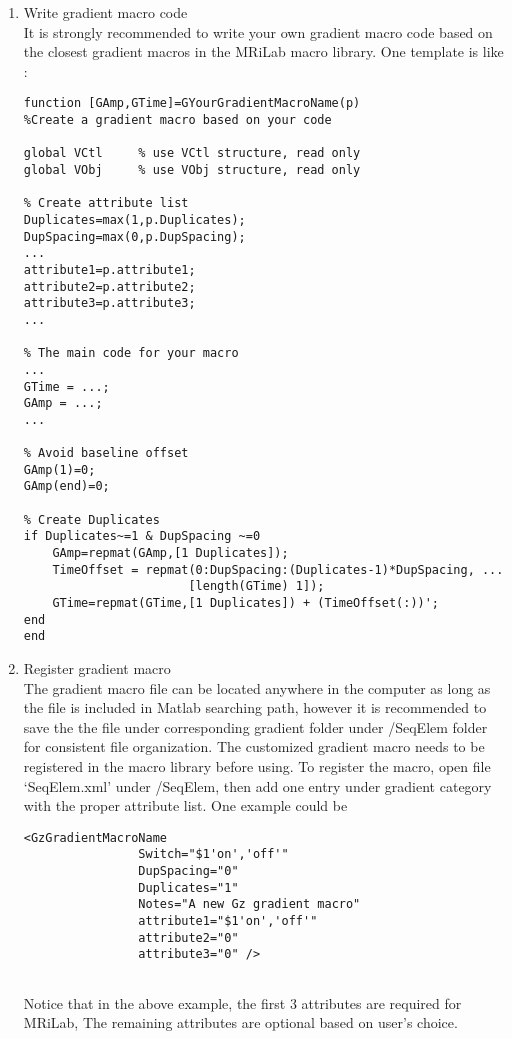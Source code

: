\documentclass{book}%
\begin{document}
\begin{enumerate}

\item Write gradient macro code \\

It is strongly recommended to write your own gradient macro code based on the closest gradient macros in the MRiLab macro library. One template is like :

\begin{verbatim}
function [GAmp,GTime]=GYourGradientMacroName(p)
%Create a gradient macro based on your code

global VCtl     % use VCtl structure, read only
global VObj     % use VObj structure, read only

% Create attribute list
Duplicates=max(1,p.Duplicates);
DupSpacing=max(0,p.DupSpacing);
...
attribute1=p.attribute1;
attribute2=p.attribute2;
attribute3=p.attribute3;
...

% The main code for your macro
...
GTime = ...;
GAmp = ...;
...

% Avoid baseline offset
GAmp(1)=0;
GAmp(end)=0;

% Create Duplicates
if Duplicates~=1 & DupSpacing ~=0
    GAmp=repmat(GAmp,[1 Duplicates]);
    TimeOffset = repmat(0:DupSpacing:(Duplicates-1)*DupSpacing, ...
                       [length(GTime) 1]);
    GTime=repmat(GTime,[1 Duplicates]) + (TimeOffset(:))';
end
end
\end{verbatim}

\item Register gradient macro \\

The gradient macro file can be located anywhere in the computer as long as the file is included in Matlab searching path, however it is recommended to save the the file under corresponding gradient folder under /SeqElem folder for consistent file organization. The customized gradient macro needs to be registered in the macro library before using. To register the macro, open file `SeqElem.xml' under /SeqElem, then add one entry under gradient category with the proper attribute list. One example could be

\begin{verbatim}
<GzGradientMacroName  
				Switch="$1'on','off'" 
				DupSpacing="0" 
				Duplicates="1" 
				Notes="A new Gz gradient macro" 
				attribute1="$1'on','off'" 
				attribute2="0" 
				attribute3="0" />
				
\end{verbatim}

Notice that in the above example, the first 3 attributes are required for MRiLab, The remaining attributes are optional based on user's choice.

\end{enumerate}
\end{document}
